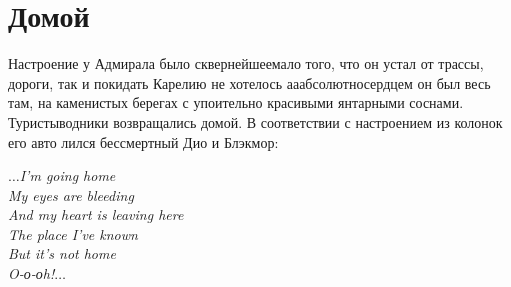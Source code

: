 \chapter{Домой}
\vepsianrose

Настроение у Адмирала было сквернейшее\mdash мало того, что он устал от трассы, дороги, так и покидать Карелию не хотелось а\sdash а\sdash абсолютно\mdash сердцем он был весь там, на каменистых берегах с упоительно красивыми янтарными соснами. Туристы\sdash водники возвращались домой. В соответствии с настроением из колонок его авто лился бессмертный Дио и Блэкмор:

\vspace{0.3cm}
\noindent\textit{%
	\hspace*{3.4cm}$\ldots$I'm going home\\
	\hspace*{3.4cm}My eyes are bleeding\\
	\hspace*{3.4cm}And my heart is leaving here\\
	\hspace*{3.4cm}The place I've known\\
	\hspace*{3.4cm}But it's not home\\
	\hspace*{3.4cm}O-о-оh!$\ldots$\\		
}
\vspace{0.3cm} 

\begin{center}
\end{center}

